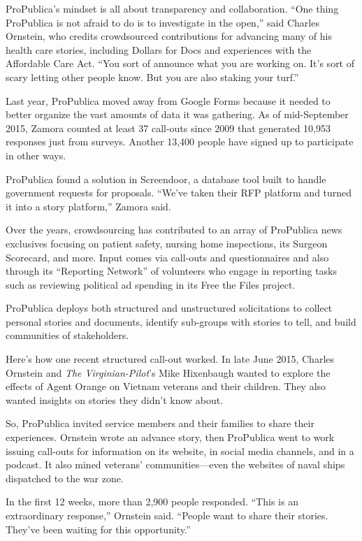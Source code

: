 \documentclass[notoc, symmetric, nobib, nols]{towcenter-guideto-book}
\begin{document}
ProPublica's mindset is all about transparency and collaboration. ``One thing ProPublica is not afraid to do is to investigate in the open,'' said Charles Ornstein, who credits crowdsourced contributions for advancing many of his health care stories, including Dollars for Docs and experiences with the Affordable Care Act. ``You sort of announce what you are working on. It's sort of scary letting other people know. But you are also staking your turf.''%

Last year, ProPublica moved away from Google Forms because it needed to better organize the vast amounts of data it was gathering. As of mid-September 2015, Zamora counted at least 37 call-outs since 2009 that generated 10,953 responses just from surveys. Another 13,400 people have signed up to participate in other ways.

ProPublica found a solution in Screendoor, a database tool built to handle government requests for proposals. ``We've taken their RFP platform and turned it into a story platform,'' Zamora said.

Over the years, crowdsourcing has contributed to an array of ProPublica news exclusives focusing on patient safety, nursing home inspections, its Surgeon Scorecard, and more. Input comes via call-outs and questionnaires and also through its ``Reporting Network'' of volunteers who engage in reporting tasks such as reviewing political ad spending in its Free the Files project.\autocite{Files}

ProPublica deploys both structured and unstructured solicitations to collect personal stories and documents, identify sub-groups with stories to tell, and build communities of stakeholders.  

Here's how one recent structured call-out worked. In late June 2015, Charles Ornstein and \textit{The Virginian-Pilot}'s Mike Hixenbaugh wanted to explore the effects of Agent Orange on Vietnam veterans and their children. They also wanted insights on stories they didn't know about.

So, ProPublica invited service members and their families to share their experiences. Ornstein wrote an advance story, then ProPublica went to work issuing call-outs for information on its website, in social media channels, and in a podcast. It also mined veterans' communities---even the websites of naval ships dispatched to the war zone. 

In the first 12 weeks, more than 2,900 people responded. ``This is an extraordinary response,'' Ornstein said. ``People want to share their stories. They've been waiting for this opportunity.''
\end{document}
